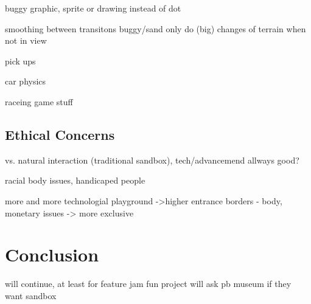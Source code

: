 \documentclass[12pt,a4paper,twoside,titlepage,headsepline,numbers=noenddot,listof=totoc,index=totoc,bibliography=totoc]{scrartcl}
\theoremstyle{break}
\begin{document}
buggy graphic, sprite or drawing instead of dot

smoothing between transitons buggy/sand
only do (big) changes of terrain when not in view

pick ups

car physics

raceing game stuff 


\subsection{Ethical Concerns}
vs. natural interaction (traditional sandbox), tech/advancemend allways good?

racial body issues, handicaped people

more and more technologial playground ->higher entrance borders - body, monetary issues -> more exclusive 


\section{Conclusion}

will continue, at least for feature jam
fun project
will ask pb museum if they want sandbox


\end{document}
